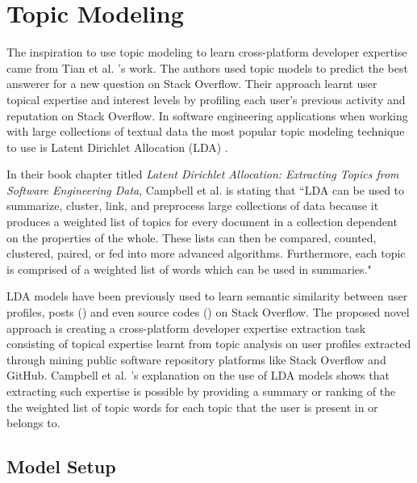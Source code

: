 \section{Topic Modeling}

    The inspiration to use topic modeling to learn cross-platform developer expertise came from Tian et al. \cite{tian2013predicting}'s work. The authors used topic models to predict the best answerer for a new question on Stack Overflow. Their approach learnt user topical expertise and interest levels by profiling each user's previous activity and reputation on Stack Overflow. In software engineering applications when working with large collections of textual data the most popular topic modeling technique to use is Latent Dirichlet Allocation (LDA) \cite{campbell2015latent}. 
    
    In their book chapter titled \textit{Latent Dirichlet Allocation: Extracting Topics from Software Engineering Data}, Campbell et al. \cite{campbell2015latent} is stating that ``LDA can be used to summarize, cluster, link, and preprocess large collections of data because it produces a weighted list of topics for every document in a collection dependent on the properties of the whole. These lists can then be compared, counted, clustered, paired, or fed into more advanced algorithms. Furthermore, each topic is comprised of a weighted list of words which can be used in summaries."
    
    LDA models have been previously used to learn semantic similarity between user profiles, posts (\cite{tian2013predicting}) and even source codes (\cite{arwan2015source}) on Stack Overflow. The proposed novel approach is creating a cross-platform developer expertise extraction task consisting of topical expertise learnt from topic analysis on user profiles extracted through mining public software repository platforms like Stack Overflow and GitHub. Campbell et al. \cite{campbell2015latent}'s explanation on the use of LDA models shows that extracting such expertise is possible by providing a summary or ranking of the the weighted list of topic words for each topic that the user is present in or belongs to. 
        
    \subsection{Model Setup \label{activeUser_Def}}
    
